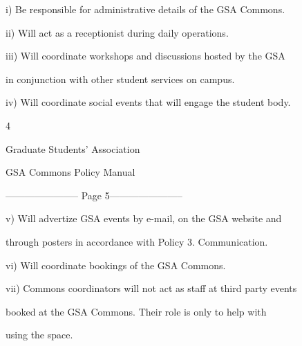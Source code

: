          i)        Be responsible for administrative details of the GSA Commons.   



  



         ii)       Will act as a receptionist during daily operations.   



  



         iii)      Will coordinate workshops and discussions hosted by the GSA  

                   in conjunction with other student services on campus.   



  



         iv)       Will coordinate social events that will engage the student body.   



  



                                                        4  

                                       

                                     Graduate Students’ Association  

                                     GSA Commons Policy Manual  

  


----------------------- Page 5-----------------------

         v)        Will advertize GSA events by e-mail, on the GSA website and  

                   through posters in accordance with Policy 3. Communication.   



  



         vi)       Will coordinate bookings of the GSA Commons.   



  



         vii)      Commons coordinators will not act as staff at third party events  

                   booked at the GSA Commons. Their role is only to help with  

                   using the space.   



